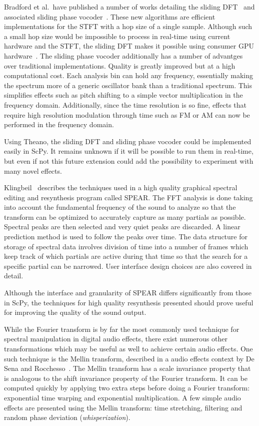 \documentclass{article}
\begin{document}
Bradford et al.\ have published a number of works detailing the sliding
DFT~\cite{bradford2005sliding} and associated sliding phase vocoder~\cite{bradford2007sliding}.
These new algorithms are efficient implementations for the STFT with a hop size of a single sample.
Although such a small hop size would be impossible to process in real-time using current hardware
and the STFT, the sliding DFT makes it possible using consumer GPU
hardware~\cite{bradford2011real}. The sliding phase vocoder additionally has a number of advantges
over traditional implementations. Quality is greatly improved but at a high computational cost. Each
analysis bin can hold any frequency, essentially making the spectrum more of a generic oscillator
bank than a traditional spectrum. This simplifies effects such as pitch shifting to a simple vector
multiplication in the frequency domain. Additionally, since the time resolution is so fine, effects
that require high resolution modulation through time such as FM or AM can now be performed in the
frequency domain.

Using Theano, the sliding DFT and sliding phase vocoder could be implemented easily in ScPy. It
remains unknown if it will be possible to run them in real-time, but even if not this future
extension could add the possibility to experiment with many novel effects.

Klingbeil~\cite{klingbeil2005software} describes the techniques used in a high quality graphical
spectral editing and resynthesis program called SPEAR\@. The FFT analysis is done taking into
account the fundamental frequency of the sound to analyze so that the transform can be optimized
to accurately capture as many partials as possible. Spectral peaks are then selected and very quiet
peaks are discarded. A linear prediction method is used to follow the peaks over time. The data
structure for storage of spectral data involves division of time into a number of frames which keep
track of which partials are active during that time so that the search for a specific partial can
be narrowed. User interface design choices are also covered in detail.

Although the interface and granularity of SPEAR differs significantly from those in ScPy, the
techniques for high quality resynthesis presented should prove useful for improving the quality of
the sound output.

While the Fourier transform is by far the most commonly used technique for spectral manipulation in
digital audio effects, there exist numerous other transformations which may be useful as well to
achieve certain audio effects. One such technique is the Mellin transform, described in a audio
effects context by De Sena and Rocchesso~\cite{de2004fast}. The Mellin transform has a scale
invariance property that is analogous to the shift invariance property of the Fourier transform. It
can be computed quickly by applying two extra steps before doing a Fourier transform: exponential
time warping and exponential multiplication. A few simple audio effects are presented using the
Mellin transform: time stretching, filtering and random phase deviation (\textit{whisperization}).
\end{document}
